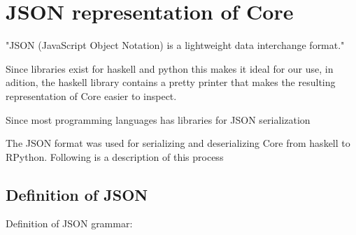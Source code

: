 \documentclass{article}
\begin{document}
\section{JSON representation of Core}

"JSON (JavaScript Object Notation) is a lightweight data interchange format."

Since libraries exist for haskell and python this makes it ideal for our use,
in adition, the haskell library contains a pretty printer that makes the resulting
representation of Core easier to inspect.

Since most programming languages has libraries for JSON serialization

The JSON format was used for serializing and deserializing Core from haskell to RPython.
Following is a description of this process


\subsection{Definition of JSON}

Definition of JSON grammar:
\end{document}
